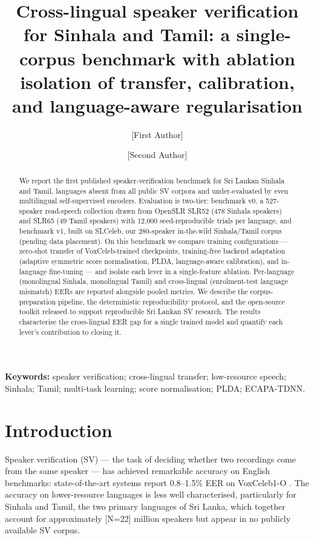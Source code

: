 \documentclass[11pt,a4paper]{article}
\title{Cross-lingual speaker verification for Sinhala and Tamil:
a single-corpus benchmark with ablation isolation of transfer,
calibration, and language-aware regularisation}
\author[1]{[First Author]}
\author[1]{[Second Author]}
\affil[1]{[Department], [University], Sri Lanka. \\
\texttt{[email@institution]}}
\date{}
\begin{document}
\maketitle

\begin{abstract}
\noindent We report the first published speaker-verification benchmark
for Sri Lankan Sinhala and Tamil, languages absent from all public SV
corpora and under-evaluated by even multilingual self-supervised
encoders. Evaluation is two-tier: benchmark v0, a 527-speaker
read-speech collection drawn from OpenSLR SLR52 (478 Sinhala speakers)
and SLR65 (49 Tamil speakers) with 12{,}000 seed-reproducible trials
per language, and benchmark v1, built on SLCeleb, our 280-speaker
in-the-wild Sinhala/Tamil corpus (pending data placement). On this
benchmark we compare training configurations --- zero-shot transfer of
VoxCeleb-trained checkpoints, training-free backend adaptation
(adaptive symmetric score normalisation, PLDA, language-aware
calibration), and in-language fine-tuning --- and isolate each lever
in a single-feature ablation. Per-language (monolingual Sinhala, monolingual
Tamil) and cross-lingual (enrolment-test language mismatch) EERs are
reported alongside pooled metrics. We describe the corpus-preparation
pipeline, the deterministic reproducibility protocol, and the
open-source toolkit released to support reproducible Sri Lankan SV
research. The results characterise the cross-lingual EER gap for a
single trained model and quantify each lever's contribution to closing
it.
\end{abstract}

\noindent \textbf{Keywords:} speaker verification; cross-lingual
transfer; low-resource speech; Sinhala; Tamil; multi-task learning;
score normalisation; PLDA; ECAPA-TDNN.

\section{Introduction}
\label{sec:intro}

Speaker verification (SV) --- the task of deciding whether two
recordings come from the same speaker --- has achieved remarkable
accuracy on English benchmarks: state-of-the-art systems report
0.8--1.5\% EER on VoxCeleb1-O \cite{desplanques2020ecapa,
nagrani2017voxceleb}. The accuracy on lower-resource languages is
less well characterised, particularly for Sinhala and Tamil, the two
primary languages of Sri Lanka, which together account for
approximately [N=22] million speakers but appear in no publicly
available SV corpus.
\end{document}
